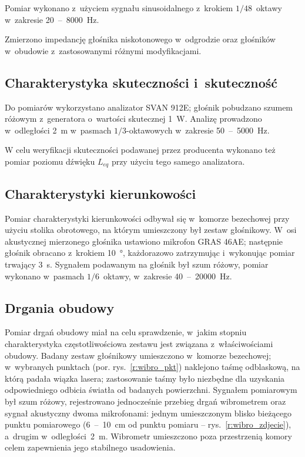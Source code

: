 \documentclass[12pt]{oska}
\newcommand{\range}[2]{\num{#1}~--~\num{#2}}
\begin{document}
			
			Pomiar wykonano z~użyciem sygnału sinusoidalnego z~krokiem $1/48$~oktawy w~zakresie \range{20}{8000}~\si{\hertz}.
			
			Zmierzono impedancję głośnika niskotonowego w~odgrodzie oraz głośników w~obudowie z~zastosowanymi różnymi modyfikacjami. 
			
		\subsection{Charakterystyka skuteczności i~skuteczność}
			
			Do pomiarów wykorzystano analizator SVAN 912E; głośnik pobudzano szumem różowym z~generatora o~wartości skutecznej \SI{1}{\watt}. Analizę prowadzono w~odległości \SI{2}{\metre} w~pasmach $1/3$-oktawowych w~zakresie \range{50}{5000}~\si{\hertz}.

			W celu weryfikacji skuteczności podawanej przez producenta wykonano też pomiar poziomu dźwięku $L_{eq}$ przy użyciu tego samego analizatora. 
			
		\subsection{Charakterystyki kierunkowości}
			
			
			Pomiar charakterystyki kierunkowości odbywał się w~komorze bezechowej przy użyciu stolika obrotowego, na którym umieszczony był zestaw głośnikowy. W~osi akustycznej mierzonego głośnika ustawiono mikrofon GRAS 46AE; następnie głośnik obracano z~krokiem \SI{10}{\degree}, każdorazowo zatrzymując i~wykonując pomiar trwający \SI{3}{\s}. Sygnałem podawanym na głośnik był szum różowy, pomiar wykonano w~pasmach $1/6$~oktawy, w~zakresie \range{40}{20000}~\si{\hertz}.
			
		\subsection{Drgania obudowy}
			
			Pomiar drgań obudowy miał na celu sprawdzenie, w~jakim stopniu charakterystyka częstotliwościowa zestawu jest związana z~właściwościami obudowy. Badany zestaw głośnikowy umieszczono w~komorze bezechowej; w~wybranych punktach (por. rys.~\ref{r:wibro_pkt}) naklejono taśmę odblaskową, na którą padała wiązka lasera; zastosowanie taśmy było niezbędne dla uzyskania odpowiedniego odbicia światła od badanych powierzchni. %
			Sygnałem pomiarowym był szum różowy, rejestrowano jednocześnie przebieg drgań wibrometrem oraz sygnał akustyczny dwoma mikrofonami: jednym umieszczonym blisko bieżącego punktu pomiarowego (\range{6}{10}~\si{\cm} od punktu pomiaru -- rys.~\ref{r:wibro_zdjecie}), a~drugim w~odległości~\SI{2}{\metre}. Wibrometr umieszczono poza przestrzenią komory celem zapewnienia jego stabilnego usadowienia.
			
\end{document}
